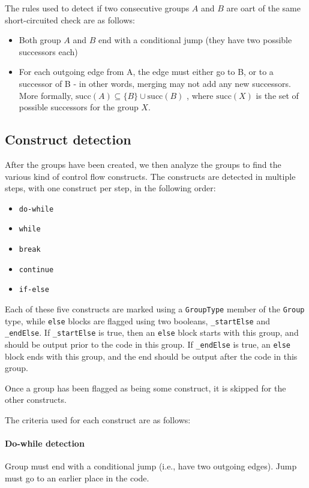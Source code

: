 The rules used to detect if two consecutive groups $A$ and $B$ are oart of the same short-circuited check are as follows:
\begin{itemize}
\item Both group $A$ and $B$ end with a conditional jump (they have two possible successors each)
\item For each outgoing edge from A, the edge must either go to B, or to a successor of B - in other words, merging may not add any new successors. More formally, $\text{succ}(A) \subseteq \{B\} \cup \text{succ}(B)$ , where $\text{succ}(X)$ is the set of possible successors for the group $X$.
\end{itemize}

\subsection{Construct detection}
After the groups have been created, we then analyze the groups to find the various kind of control flow constructs. The constructs are detected in multiple steps, with one construct per step, in the following order:
\begin{itemize}
\item \verb+do-while+
\item \verb+while+
\item \verb+break+
\item \verb+continue+
\item \verb+if-else+
\end{itemize}

Each of these five constructs are marked using a \verb+GroupType+ member of the \verb+Group+ type, while \verb+else+ blocks are flagged using two booleans, \verb+_startElse+ and \verb+_endElse+. If \verb+_startElse+ is true, then an \verb+else+ block starts with this group, and should be output prior to the code in this group. If \verb+_endElse+ is true, an \verb+else+ block ends with this group, and the end should be output after the code in this group.

Once a group has been flagged as being some construct, it is skipped for the other constructs.

The criteria used for each construct are as follows:

\paragraph{Do-while detection}
Group must end with a conditional jump (i.e., have two outgoing edges). Jump must go to an earlier place in the code.

